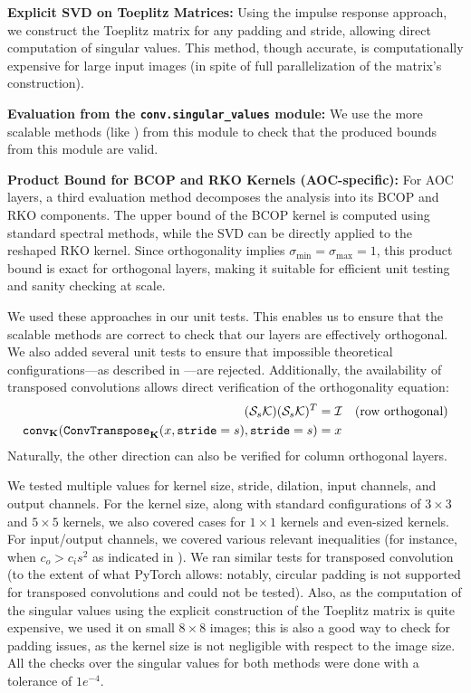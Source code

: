     \textbf{Explicit SVD on Toeplitz Matrices:} Using the impulse response approach, we construct the Toeplitz matrix for any padding and stride, allowing direct computation of singular values. This method, though accurate, is computationally expensive for large input images (in spite of full parallelization of the matrix's construction).
    
    \textbf{Evaluation from the \texttt{conv.singular\_values} module:} We use the more scalable methods (like \cite{delattre2023efficient, delattre2024spectral, grishina_tight_2024}) from this module to check that the produced bounds from this module are valid.

    \textbf{Product Bound for BCOP and RKO Kernels (AOC-specific):} For AOC layers, a third evaluation method decomposes the analysis into its BCOP and RKO components. The upper bound of the BCOP kernel is computed using standard spectral methods, while the SVD can be directly applied to the reshaped RKO kernel. Since orthogonality implies $\sigma_{\min} = \sigma_{\max} = 1$, this product bound is exact for orthogonal layers, making it suitable for efficient unit testing and sanity checking at scale.
    
    We used these approaches in our unit tests. This enables us to ensure that the scalable methods are correct to check that our layers are effectively orthogonal. We also added several unit tests to ensure that impossible theoretical configurations—as described in \cite{achour2022existence}—are rejected. Additionally, the availability of transposed convolutions allows direct verification of the orthogonality equation:
    \begin{align*}
        (\mathcal{S}_{s} \mathcal{K})(\mathcal{S}_{s} \mathcal{K})^T &= \mathcal{I} \quad \text{(row orthogonal)} \\
        \mathtt{conv}_{\mathbf{K}}(\mathtt{ConvTranspose}_{\mathbf{K}}(x, \mathtt{stride}=s), \mathtt{stride}=s) &= x
    \end{align*}
    Naturally, the other direction can also be verified for column orthogonal layers.

    We tested multiple values for kernel size, stride, dilation, input channels, and output channels. For the kernel size, along with standard configurations of $3 \times 3$ and $5 \times 5$ kernels, we also covered cases for $1 \times 1$ kernels and even-sized kernels. For input/output channels, we covered various relevant inequalities (for instance, when $c_o > c_is^2$ as indicated in \cite{achour2022existence}).
    We ran similar tests for transposed convolution (to the extent of what PyTorch allows: notably, circular padding is not supported for transposed convolutions and could not be tested). Also, as the computation of the singular values using the explicit construction of the Toeplitz matrix is quite expensive, we used it on small $8 \times 8$ images; this is also a good way to check for padding issues, as the kernel size is not negligible with respect to the image size. All the checks over the singular values for both methods were done with a tolerance of $1e^{-4}$.

